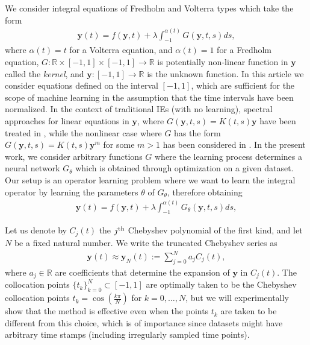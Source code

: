 \documentclass[11pt,fleqn]{amsart} %
\begin{document}
	We consider integral equations of Fredholm and Volterra types which take the form
	\begin{eqnarray}\label{eqn:IE1D}
	\mathbf y(t) = f(\mathbf y,t) + \lambda\int_{-1}^{\alpha(t)} G(\mathbf y, t,s)ds,
	\end{eqnarray}
	where $\alpha(t) = t$ for a Volterra equation, and $\alpha(t) = 1$ for a Fredholm equation, $G : \mathbb R\times [-1,1] \times [-1,1] \longrightarrow \mathbb R$ is potentially non-linear function in $\mathbf y$ called the {\it kernel}, and $\mathbf y: [-1,1] \longrightarrow \mathbb R$ is the unknown function. In this article we consider equations defined on the interval $[-1,1]$, which are sufficient for the scope of machine learning in the assumption that the time intervals have been normalized. In the context of traditional IEs (with no learning), spectral approaches for linear equations in $\mathbf y$, where $G(\mathbf y,t,s) = K(t,s)\mathbf y$ have been treated in \cite{Liu}, while the nonlinear case where $G$ has the form $G(\mathbf y,t,s) = K(t,s)\mathbf y^m$ for some $m>1$ has been considered in \cite{Yang}. In the present work, we consider arbitrary functions $G$ where the learning process determines a neural network $G_\theta$ which is obtained through optimization on a given dataset. Our setup is an operator learning problem where we want to learn the integral operator by learning the parameters $\theta$ of $G_\theta$, therefore obtaining
	\begin{eqnarray}\label{eqn:NIE1D}
	\mathbf y(t) = f(\mathbf y,t) + \lambda\int_{-1}^{\alpha(t)} G_\theta(\mathbf y, t,s)ds,
	\end{eqnarray}
	
	Let us denote by $C_j(t)$ the $j^{\rm th}$ Chebyshev polynomial of the first kind, and let $N$ be a fixed natural number. We write the truncated Chebyshev series as 
	\begin{eqnarray}\label{eqn:Cheb_series}
	\mathbf y(t) \approx \mathbf y_N(t) := \sum_{j=0}^N a_j C_j(t),
	\end{eqnarray}
	where $a_j\in \mathbb R$ are coefficients that determine the expansion of $\mathbf y$ in $C_j(t)$. The collocation points $\{t_k\}_{k=0}^N \subset [-1,1]$ are optimally taken to be the Chebyshev collocation points $t_k = \cos(\frac{k\pi}{N})$ for $k=0, \ldots, N$, but we will experimentally show that the method is effective even when the points $t_k$ are taken to be different from this choice, which is of importance since datasets might have arbitrary time stamps (including irregularly sampled time points).  
	
\end{document}
